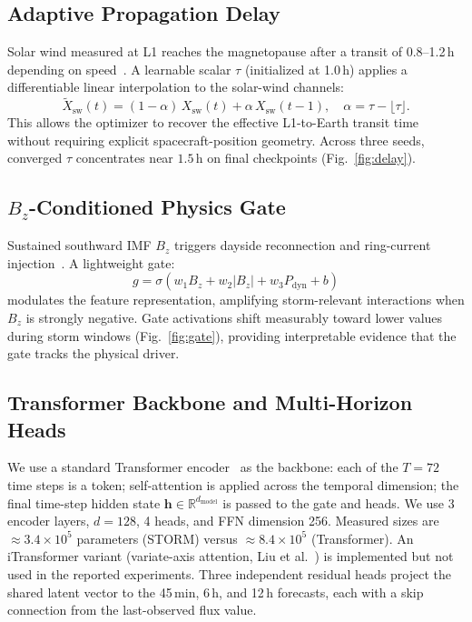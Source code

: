 \documentclass[conference]{IEEEtran}
\begin{document}
\subsection{Adaptive Propagation Delay}
Solar wind measured at L1 reaches the magnetopause after a transit of
0.8--1.2\,h depending on speed~\cite{forsyth2020}. A learnable scalar
\(\tau\) (initialized at 1.0\,h) applies a differentiable linear interpolation
to the solar-wind channels:
\begin{equation}
\tilde{X}_{\mathrm{sw}}(t) =
(1-\alpha)\,X_{\mathrm{sw}}(t) +
\alpha\,X_{\mathrm{sw}}(t-1),
\quad\alpha=\tau-\lfloor\tau\rfloor.
\end{equation}
This allows the optimizer to recover the effective L1-to-Earth transit time
without requiring explicit spacecraft-position geometry. Across three seeds,
converged \(\tau\) concentrates near \(1.5\,\mathrm{h}\) on final checkpoints (Fig.~\ref{fig:delay}).

\subsection{\(B_z\)-Conditioned Physics Gate}
Sustained southward IMF \(B_z\) triggers dayside reconnection and ring-current
injection~\cite{horne2005wave}. A lightweight gate:
\begin{equation}
g = \sigma(w_1 B_z + w_2|B_z| + w_3 P_{\mathrm{dyn}} + b)
\end{equation}
modulates the feature representation, amplifying storm-relevant interactions
when \(B_z\) is strongly negative. Gate activations shift measurably toward
lower values during storm windows (Fig.~\ref{fig:gate}), providing
interpretable evidence that the gate tracks the physical driver.

\subsection{Transformer Backbone and Multi-Horizon Heads}
We use a standard Transformer encoder~\cite{vaswani2017} as the backbone:
each of the \(T=72\) time steps is a token; self-attention is applied
across the temporal dimension; the final time-step hidden state
\(\mathbf{h}\in\mathbb{R}^{d_{\mathrm{model}}}\) is passed to the gate and heads.
We use 3 encoder layers, \(d=128\), 4 heads, and FFN dimension 256.
Measured sizes are \(\approx3.4\times10^{5}\) parameters (STORM) versus \(\approx8.4\times10^{5}\) (Transformer).
An iTransformer variant (variate-axis attention, Liu et al.~\cite{liu2024itrans})
is implemented but not used in the reported experiments.
Three independent residual heads
project the shared latent vector to the 45\,min, 6\,h, and 12\,h forecasts,
each with a skip connection from the last-observed flux value.
\end{document}
